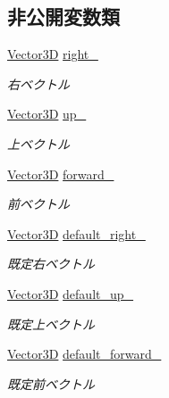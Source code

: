 \subsection*{非公開変数類}
\begin{DoxyCompactItemize}
\item 
\mbox{\hyperlink{class_vector3_d}{Vector3D}} \mbox{\hyperlink{class_matrix_a49474d6852e69b73066efa3c0bf648ac}{right\+\_\+}}
\begin{DoxyCompactList}\small\item\em 右ベクトル \end{DoxyCompactList}\item 
\mbox{\hyperlink{class_vector3_d}{Vector3D}} \mbox{\hyperlink{class_matrix_a1b63002dc85564fe623cd0ad5646cc2e}{up\+\_\+}}
\begin{DoxyCompactList}\small\item\em 上ベクトル \end{DoxyCompactList}\item 
\mbox{\hyperlink{class_vector3_d}{Vector3D}} \mbox{\hyperlink{class_matrix_a2759a4a1b7542efd88f2c7c91886cdb7}{forward\+\_\+}}
\begin{DoxyCompactList}\small\item\em 前ベクトル \end{DoxyCompactList}\item 
\mbox{\hyperlink{class_vector3_d}{Vector3D}} \mbox{\hyperlink{class_matrix_ac376ec9634c70db2366247a1133416b9}{default\+\_\+right\+\_\+}}
\begin{DoxyCompactList}\small\item\em 既定右ベクトル \end{DoxyCompactList}\item 
\mbox{\hyperlink{class_vector3_d}{Vector3D}} \mbox{\hyperlink{class_matrix_ac48c2c66fab401482576b039d1260233}{default\+\_\+up\+\_\+}}
\begin{DoxyCompactList}\small\item\em 既定上ベクトル \end{DoxyCompactList}\item 
\mbox{\hyperlink{class_vector3_d}{Vector3D}} \mbox{\hyperlink{class_matrix_a15c25940156b22911e7e5e240ca49a16}{default\+\_\+forward\+\_\+}}
\begin{DoxyCompactList}\small\item\em 既定前ベクトル \end{DoxyCompactList}\end{DoxyCompactItemize}
